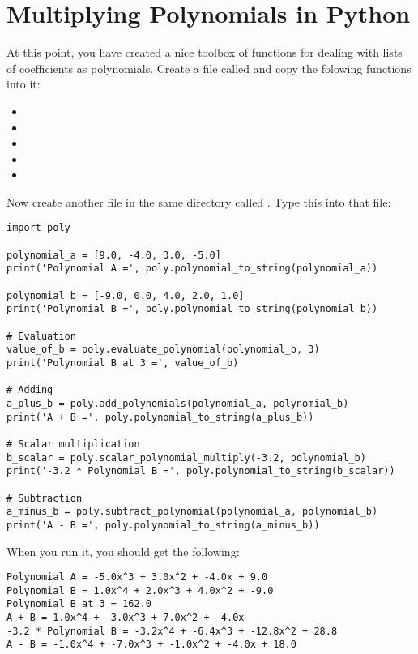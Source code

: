 \chapter{Multiplying Polynomials in Python}

At this point, you have created a nice toolbox of functions for
dealing with lists of coefficients as polynomials. Create a file called  and copy the folowing functions into it:
\begin{itemize}
\item {}
\item {}
\item {}
\item {}
\item {}
\end{itemize}

Now create another file in the same directory called . Type this into that file:
\begin{Verbatim}
import poly

polynomial_a = [9.0, -4.0, 3.0, -5.0]
print('Polynomial A =', poly.polynomial_to_string(polynomial_a))

polynomial_b = [-9.0, 0.0, 4.0, 2.0, 1.0]
print('Polynomial B =', poly.polynomial_to_string(polynomial_b))

# Evaluation
value_of_b = poly.evaluate_polynomial(polynomial_b, 3)
print('Polynomial B at 3 =', value_of_b)

# Adding
a_plus_b = poly.add_polynomials(polynomial_a, polynomial_b)
print('A + B =', poly.polynomial_to_string(a_plus_b))

# Scalar multiplication
b_scalar = poly.scalar_polynomial_multiply(-3.2, polynomial_b)
print('-3.2 * Polynomial B =', poly.polynomial_to_string(b_scalar))

# Subtraction
a_minus_b = poly.subtract_polynomial(polynomial_a, polynomial_b)
print('A - B =', poly.polynomial_to_string(a_minus_b))
\end{Verbatim}

When you run it, you should get the following:
\begin{Verbatim}
Polynomial A = -5.0x^3 + 3.0x^2 + -4.0x + 9.0
Polynomial B = 1.0x^4 + 2.0x^3 + 4.0x^2 + -9.0
Polynomial B at 3 = 162.0
A + B = 1.0x^4 + -3.0x^3 + 7.0x^2 + -4.0x
-3.2 * Polynomial B = -3.2x^4 + -6.4x^3 + -12.8x^2 + 28.8
A - B = -1.0x^4 + -7.0x^3 + -1.0x^2 + -4.0x + 18.0
\end{Verbatim}

